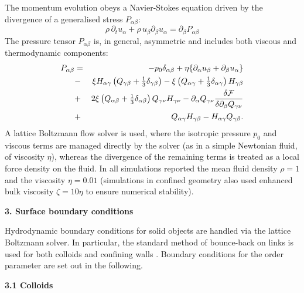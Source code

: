 \documentclass[12pt,twoside]{article}
\begin{document}
The momentum evolution obeys a Navier-Stokes equation driven by the divergence
of a generalised stress $P_{\alpha\beta}$:
\begin{equation}
\label{nse}
\rho\,\partial_tu_\alpha +\rho \,u_\beta \partial_\beta u_\alpha
=\partial_\beta P_{\alpha\beta}
\end{equation}
The pressure tensor $P_{\alpha\beta}$ is, in general, asymmetric and includes
both viscous and thermodynamic components:
\begin{eqnarray}
P_{\alpha \beta}&=&
- p_0 \delta_{\alpha \beta} 
+ \eta \{ \partial_\alpha u_\beta + \partial_\beta u_\alpha\}
\nonumber\\
&-&  \xi H_{\alpha \gamma}\left(Q_{\gamma \beta}
+ {\textstyle \frac{1}{3}} \delta_{\gamma \beta} \right)
-\xi \left(Q_{\alpha \gamma}
+ { \textstyle \frac{1}{3}} \delta_{\alpha \gamma}\right) H_{\gamma \beta}
\nonumber\\ 
&+& 2 \xi  \left(Q_{\alpha \beta}
+ {\textstyle \frac{1}{3}} \delta_{\alpha \beta}\right) Q_{\gamma \nu} H_{\gamma \nu}
-\partial_\alpha Q_{\gamma \nu}
\frac{\delta{\cal F}}{\delta \partial_{\beta} Q_{\gamma \nu}}\nonumber\\
&+& Q_{\alpha \gamma}H_{\gamma \beta}-H_{\alpha \gamma} Q_{\gamma \beta}.
\end{eqnarray}
A lattice Boltzmann flow solver is used, where the isotropic pressure $p_0$
and viscous terms are managed directly by the solver (as in a simple Newtonian
fluid, of viscosity $\eta$), whereas the divergence of the remaining terms
is treated as a local force density on the fluid. In all simulations
reported the mean fluid density $\rho = 1$ and the viscosity
$\eta = 0.01$ (simulations in confined geometry also used enhanced
bulk viscosity $\zeta = 10\eta$ to ensure numerical stability).


{\bf 3. Surface boundary conditions}

Hydrodynamic boundary conditions for solid objects are handled via
the lattice Boltzmann solver. In particular, the standard method of
bounce-back on links is used for both colloids and confining walls
\cite{ladd94,nguyen2002}. Boundary conditions for the order parameter
are set out in the following.

{\bf 3.1 Colloids}
\end{document}
